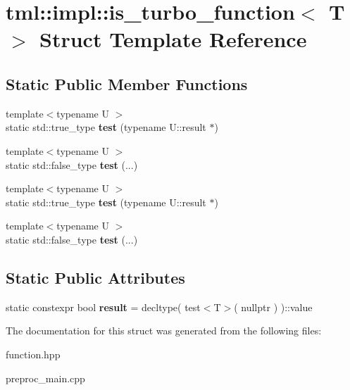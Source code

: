 \hypertarget{structtml_1_1impl_1_1is__turbo__function}{\section{tml\+:\+:impl\+:\+:is\+\_\+turbo\+\_\+function$<$ T $>$ Struct Template Reference}
\label{structtml_1_1impl_1_1is__turbo__function}
}
\subsection*{Static Public Member Functions}
\begin{DoxyCompactItemize}
\item 
\hypertarget{structtml_1_1impl_1_1is__turbo__function_a080908c6ec87239783ef06ef5f7b094f}{{\footnotesize template$<$typename U $>$ }\\static std\+::true\+\_\+type {\bfseries test} (typename U\+::result $\ast$)}\label{structtml_1_1impl_1_1is__turbo__function_a080908c6ec87239783ef06ef5f7b094f}

\item 
\hypertarget{structtml_1_1impl_1_1is__turbo__function_adb46a6d1b25b0f6887450346229ba2a4}{{\footnotesize template$<$typename U $>$ }\\static std\+::false\+\_\+type {\bfseries test} (...)}\label{structtml_1_1impl_1_1is__turbo__function_adb46a6d1b25b0f6887450346229ba2a4}

\item 
\hypertarget{structtml_1_1impl_1_1is__turbo__function_a080908c6ec87239783ef06ef5f7b094f}{{\footnotesize template$<$typename U $>$ }\\static std\+::true\+\_\+type {\bfseries test} (typename U\+::result $\ast$)}\label{structtml_1_1impl_1_1is__turbo__function_a080908c6ec87239783ef06ef5f7b094f}

\item 
\hypertarget{structtml_1_1impl_1_1is__turbo__function_adb46a6d1b25b0f6887450346229ba2a4}{{\footnotesize template$<$typename U $>$ }\\static std\+::false\+\_\+type {\bfseries test} (...)}\label{structtml_1_1impl_1_1is__turbo__function_adb46a6d1b25b0f6887450346229ba2a4}

\end{DoxyCompactItemize}
\subsection*{Static Public Attributes}
\begin{DoxyCompactItemize}
\item 
\hypertarget{structtml_1_1impl_1_1is__turbo__function_af822cd9cf7f5fff88df7beb150ee2c85}{static constexpr bool {\bfseries result} = decltype( test$<$T$>$( nullptr ) )\+::value}\label{structtml_1_1impl_1_1is__turbo__function_af822cd9cf7f5fff88df7beb150ee2c85}

\end{DoxyCompactItemize}


The documentation for this struct was generated from the following files\+:\begin{DoxyCompactItemize}
\item 
function.\+hpp\item 
preproc\+\_\+main.\+cpp\end{DoxyCompactItemize}
